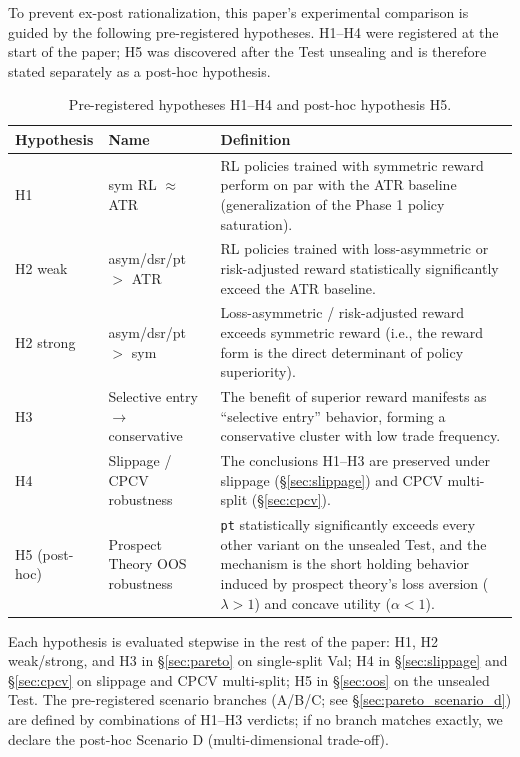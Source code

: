 \documentclass[11pt, a4paper]{article}
\begin{document}
To prevent ex-post rationalization, this paper's experimental comparison is
guided by the following pre-registered hypotheses. H1--H4 were registered at
the start of the paper; H5 was discovered after the Test unsealing and is
therefore stated separately as a post-hoc hypothesis.

\begin{table}[!htbp]
\centering
\small
\caption{Pre-registered hypotheses H1--H4 and post-hoc hypothesis H5.}
\begin{tabular}{p{1.3cm}p{4cm}p{8cm}}
\toprule
Hypothesis & Name & Definition \\
\midrule
H1 & sym RL $\approx$ ATR & RL policies trained with symmetric reward perform on par with the ATR baseline (generalization of the Phase 1 policy saturation). \\
H2 weak & asym/dsr/pt $>$ ATR & RL policies trained with loss-asymmetric or risk-adjusted reward statistically significantly exceed the ATR baseline. \\
H2 strong & asym/dsr/pt $>$ sym & Loss-asymmetric / risk-adjusted reward exceeds symmetric reward (i.e., the reward form is the direct determinant of policy superiority). \\
H3 & Selective entry $\to$ conservative & The benefit of superior reward manifests as ``selective entry'' behavior, forming a conservative cluster with low trade frequency. \\
H4 & Slippage / CPCV robustness & The conclusions H1--H3 are preserved under slippage (\S\ref{sec:slippage}) and CPCV multi-split (\S\ref{sec:cpcv}). \\
\midrule
H5 (post-hoc) & Prospect Theory OOS robustness & \texttt{pt} statistically significantly exceeds every other variant on the unsealed Test, and the mechanism is the short holding behavior induced by prospect theory's loss aversion ($\lambda > 1$) and concave utility ($\alpha < 1$). \\
\bottomrule
\end{tabular}
\label{tab:hypotheses}
\end{table}

Each hypothesis is evaluated stepwise in the rest of the paper:
H1, H2 weak/strong, and H3 in \S\ref{sec:pareto} on single-split Val;
H4 in \S\ref{sec:slippage} and \S\ref{sec:cpcv} on slippage and CPCV
multi-split; H5 in \S\ref{sec:oos} on the unsealed Test. The
pre-registered scenario branches (A/B/C; see \S\ref{sec:pareto_scenario_d})
are defined by combinations of H1--H3 verdicts; if no branch matches exactly,
we declare the post-hoc Scenario D (multi-dimensional trade-off).
\end{document}
